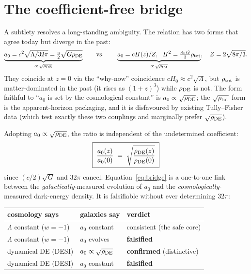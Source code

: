 \documentclass[11pt]{article}
\newcommand{\az}{a_0}
\newcommand{\rde}{\rho_{\rm DE}}
\begin{document}
\section{The coefficient-free bridge}
\label{sec:bridge}
A subtlety resolves a long-standing ambiguity. The relation has two forms that agree today but diverge in the past:
\begin{equation}
\underbrace{\az=c^2\sqrt{\Lambda/32\pi}=\tfrac{c}{2}\sqrt{G\rde}}_{\propto\,\sqrt{\rde}}
\qquad\text{vs.}\qquad
\underbrace{\az=cH(z)/Z,\ \ H^2=\tfrac{8\pi G}{3}\rho_{\rm tot}}_{\propto\,\sqrt{\rho_{\rm tot}}},
\quad Z=2\sqrt{8\pi/3}.
\end{equation}
They coincide at $z=0$ via the ``why-now'' coincidence $cH_0\approx c^2\sqrt\Lambda$, but $\rho_{\rm tot}$ is
matter-dominated in the past (it rises as $(1+z)^3$) while $\rde$ is not. The form faithful to ``$\az$ is set by the
cosmological constant'' is $\az\propto\sqrt{\rde}$; the $\sqrt{\rho_{\rm tot}}$ form is the apparent-horizon
packaging, and it is disfavoured by existing Tully--Fisher data \cite{Limbach2008,Milgrom2017} (which test exactly
these two couplings and marginally prefer $\sqrt{\rde}$).

Adopting $\az\propto\sqrt{\rde}$, the ratio is independent of the undetermined coefficient:
\begin{equation}
\boxed{\;\frac{\az(z)}{\az(0)} \;=\; \sqrt{\frac{\rde(z)}{\rde(0)}}\;}
\label{eq:bridge}
\end{equation}
since $(c/2)\sqrt{G}$ and $32\pi$ cancel. Equation~\eqref{eq:bridge} is a one-to-one link between the
\emph{galactically}-measured evolution of $\az$ and the \emph{cosmologically}-measured dark-energy density. It is
falsifiable without ever determining $32\pi$:

\begin{center}
\begin{tabular}{lll}
\toprule
cosmology says & galaxies say & verdict\\
\midrule
$\Lambda$ constant ($w=-1$) & $\az$ constant & consistent (the safe core)\\
$\Lambda$ constant ($w=-1$) & $\az$ evolves & \textbf{falsified}\\
dynamical DE (DESI) & $\az\propto\sqrt{\rde}$ & \textbf{confirmed} (distinctive)\\
dynamical DE (DESI) & $\az$ constant & \textbf{falsified}\\
\bottomrule
\end{tabular}
\end{center}
\end{document}
